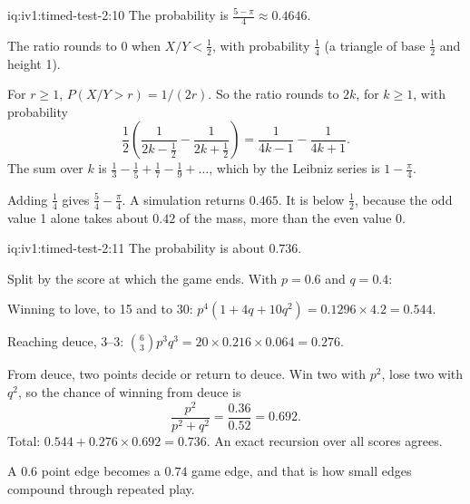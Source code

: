 \begin{solution}{iq:iv1:timed-test-2:10}
The probability is $\frac{5 - \pi}{4} \approx 0.4646$.

The ratio rounds to 0 when $X/Y < \frac12$, with probability $\frac14$ (a triangle of base $\frac12$ and height 1).

For $r \ge 1$, $P(X/Y > r) = 1/(2r)$. So the ratio rounds to $2k$, for $k \ge 1$, with probability
\[
\frac12\left(\frac{1}{2k - \frac12} - \frac{1}{2k + \frac12}\right) = \frac{1}{4k - 1} - \frac{1}{4k + 1}.
\]
The sum over $k$ is $\frac13 - \frac15 + \frac17 - \frac19 + \dots$, which by the Leibniz series is $1 - \frac{\pi}{4}$.

Adding $\frac14$ gives $\frac54 - \frac{\pi}{4}$. A simulation returns $0.465$. It is below $\frac12$, because the odd value 1 alone takes about $0.42$ of the mass, more than the even value 0.

\end{solution}

\begin{solution}{iq:iv1:timed-test-2:11}
The probability is about $0.736$.

Split by the score at which the game ends. With $p = 0.6$ and $q = 0.4$:

Winning to love, to 15 and to 30: $p^4(1 + 4q + 10q^2) = 0.1296 \times 4.2 = 0.544$.

Reaching deuce, 3--3: $\binom63p^3q^3 = 20 \times 0.216 \times 0.064 = 0.276$.

From deuce, two points decide or return to deuce. Win two with $p^2$, lose two with $q^2$, so the chance of winning from deuce is
\[
\frac{p^2}{p^2 + q^2} = \frac{0.36}{0.52} = 0.692.
\]
Total: $0.544 + 0.276 \times 0.692 = 0.736$. An exact recursion over all scores agrees.

A $0.6$ point edge becomes a $0.74$ game edge, and that is how small edges compound through repeated play.

\end{solution}


